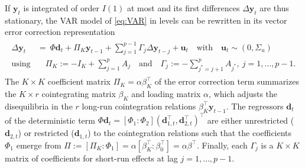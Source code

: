 If $ \boldsymbol{y}_{t} $ is integrated of order $ I(1) $ at most and its first differences $ \Delta \boldsymbol{y}_{t} $ are thus stationary, the VAR model of \eqref{eq:VAR} in levels can be rewritten in its vector error correction representation
\begin{align} \label{eq:VECM}
\begin{split}
	\Delta \boldsymbol{y}_{t} \ & = \ \Phi \boldsymbol{d}_{t} + \Pi_{K} \boldsymbol{y}_{t-1} + \sum_{j=1}^{p-1} \Gamma_{j} \Delta \boldsymbol{y}_{t-j} + \boldsymbol{u}_{t} \quad \textrm{with} \quad \boldsymbol{u}_{t} \sim (0,\Sigma_u)
	\\ \textrm{using} & \quad \Pi_{K} := -I_K+\sum_{j=1}^{p} A_j \quad \textrm{and} \quad \Gamma_j := -\sum_{j^*=j+1}^{p} A_{j^*}, \ j=1,\ldots,p-1.
\end{split}
\end{align}
The $ K \times K $ coefficient matrix $ \Pi_{K} = \alpha\beta_{K}^\top $ of the error correction term summarizes the \mbox{$ K \times r $} cointegrating matrix $ \beta_{K} $ and loading matrix $ \alpha $, which adjusts the disequilibria in the $ r $ long-run cointegration relations $ \beta_{K}^\top \boldsymbol{y}_{t-1} $. The regressors $ \boldsymbol{d}_{t} $ of the deterministic term $ \Phi \boldsymbol{d}_t = \left[ \Phi_1 : \Phi_{2} \right] \left( \boldsymbol{d}_{1,t}^\top, \boldsymbol{d}_{2,t}^\top \right)^\top $ are either unrestricted ($ \boldsymbol{d}_{2,t} $) or restricted ($ \boldsymbol{d}_{1,t} $) to the cointegration relations such that the coefficients $ \Phi_1 $ emerge from $ \Pi := \left[ \Pi_{K} : \Phi_1 \right] = \alpha \left[ \beta_{K}^\top : \beta_0^\top \right] = \alpha \beta^\top $. Finally, each $ \Gamma_{j} $ is a $ K \times K $ matrix of coefficients for short-run effects at lag $ j=1,\ldots,p-1 $.


